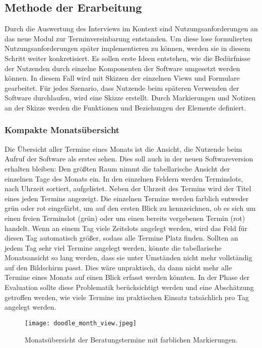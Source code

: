 \subsection*{Methode der Erarbeitung}
Durch die Auswertung des Interviews im Kontext sind Nutzungsanforderungen an
das neue Modul zur Terminvereinbarung entstanden. Um diese lose formulierten
Nutzungsanforderungen später implementieren zu können, werden sie in diesem
Schritt weiter konkretisiert. Es sollen erste Ideen entstehen, wie die
Bedürfnisse der Nutzenden durch einzelne Komponenten der Software umgesetzt
werden können. In diesem Fall wird mit Skizzen der einzelnen \glspl{View} und
Formulare gearbeitet. Für jedes Szenario, dass Nutzende beim späteren Verwenden
der Software durchlaufen, wird eine Skizze erstellt. Durch Markierungen und
Notizen an der Skizze werden die Funktionen und Beziehungen der Elemente
definiert.

\subsubsection{Kompakte Monatsübersicht}

Die Übersicht aller Termine eines Monats ist die Ansicht, die Nutzende beim
Aufruf der Software als erstes sehen. Dies soll auch in der neuen
Softwareversion erhalten bleiben: Den größten Raum nimmt die tabellarische
Ansicht der einzelnen Tage des Monats ein. In den einzelnen Feldern werden
Terminslots, nach Uhrzeit sortiert, aufgelistet. Neben der Uhrzeit des Termins
wird der Titel eines jeden Termins angezeigt. Die einzelnen Termine werden
farblich entweder grün oder rot eingefärbt, um auf den ersten Blick zu
kennzeichnen, ob es sich um einen freien Terminslot (grün) oder um einen
bereits vergebenen Termin (rot) handelt. Wenn an einem Tag viele Zeitslots
angelegt werden, wird das Feld für diesen Tag automatisch größer, sodass alle
Termine Platz finden. Sollten an jedem Tag sehr viel Termine angelegt werden,
könnte die tabellarische Monatsansicht so lang werden, dass sie unter Umständen
nicht mehr vollständig auf den Bildschirm passt. Dies wäre unpraktisch, da dann
nicht mehr alle Termine eines Monats auf einen Blick erfasst werden könnten. In
der Phase der Evaluation sollte diese Problematik berücksichtigt werden und
eine Abschätzung getroffen werden, wie viele Termine im praktischen Einsatz
tatsächlich pro Tag angelegt werden.

\begin{figure}[H]
    \caption{Monatsübersicht der Beratungstermine mit farblichen Markierungen.}
    \centering
    \texttt{[image: doodle\_month\_view.jpeg]}
\end{figure}

